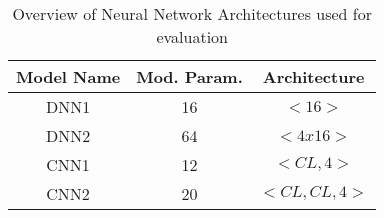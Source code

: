 \begin{table}[htbp]
    \centering
    \caption{Overview of Neural Network Architectures used for evaluation}
    \begin{tabular}{|c|c|c|}
        \hline
        Model Name            & Mod. Param.         & Architecture                 \\ \hline
        \multirow{2}{*}{DNN1} & \multirow{2}{*}{16} & \multirow{2}{*}{$<16>$}      \\
        &                     &                              \\ \hline
        \multirow{2}{*}{DNN2} & \multirow{2}{*}{64} & \multirow{2}{*}{$<4x16>$}    \\
        &                     &                              \\ \hline
        \multirow{2}{*}{CNN1} & \multirow{2}{*}{12} & \multirow{2}{*}{$<CL,4>$}    \\
        &                     &                              \\ \hline
        \multirow{2}{*}{CNN2} & \multirow{2}{*}{20} & \multirow{2}{*}{$<CL,CL,4>$} \\
        &                     &                              \\ \hline
    \end{tabular}
    \label{tab:archi}
\end{table}
